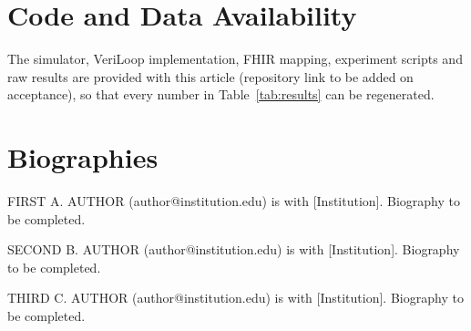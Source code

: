 \documentclass[journal,twoside,web]{IEEEmiot}
\begin{document}
\section{Code and Data Availability}
The simulator, VeriLoop implementation, FHIR mapping, experiment scripts and raw results are provided with this
article (repository link to be added on acceptance), so that every number in Table~\ref{tab:results} can be
regenerated.




\section{Biographies}
\vspace*{-30pt}
\begin{biographynophoto}
{FIRST A. AUTHOR} (author@institution.edu) is with [Institution]. Biography to be completed.

{SECOND B. AUTHOR} (author@institution.edu) is with [Institution]. Biography to be completed.

{THIRD C. AUTHOR} (author@institution.edu) is with [Institution]. Biography to be completed.
\end{biographynophoto}

\vfill
\end{document}
